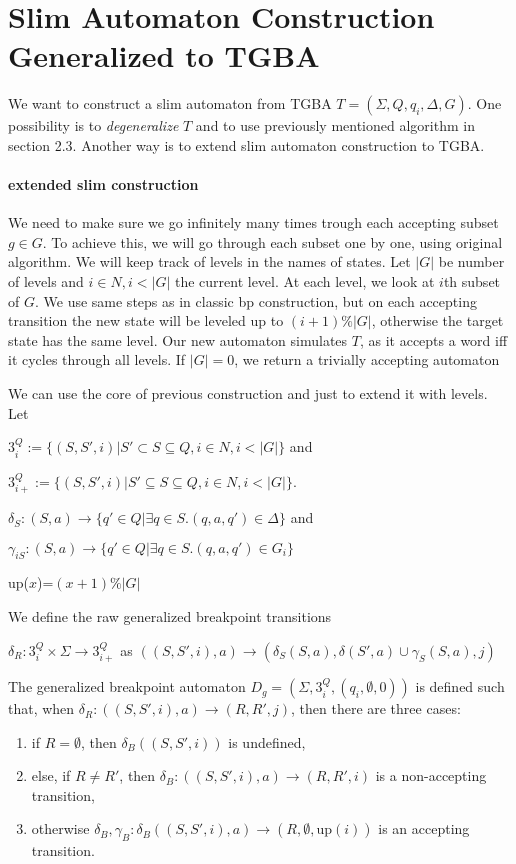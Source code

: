\documentclass[
	digital
nolof, nolot
]{fithesis3}
\begin{document}
			\section{Slim Automaton Construction Generalized to TGBA}
			We want to construct a slim automaton from TGBA $T=(\Sigma, Q, q_i, \Delta, G)$. One possibility is to \emph{degeneralize} $T$ and to use previously mentioned algorithm in section 2.3. Another way is to extend slim automaton construction to TGBA.
			\paragraph{extended slim construction}
			We need to make sure we go infinitely many times trough each accepting subset $g \in G$. To achieve this, we will go through each subset one by one, using original algorithm. We will keep track of levels in the names of states. Let $|G|$ be number of levels and $i \in N, i<|G|$ the current level. At each level, we look at $i$th subset of $G$. We use same steps as in classic bp construction, but on each accepting transition the new state will be leveled up to $(i+1)\%|G|$, otherwise the target state has the same level. Our new automaton simulates $T$, as it accepts a word iff it cycles through all levels. If $|G|=0$, we return a trivially accepting automaton
			
			We can use the core of previous construction and just to extend it with levels. Let
			
			$3^Q_i :=\{(S,S',i)|S'\subset S \subseteq Q, i \in N, i<|G|\}$ and
			
			$3^Q_{i+}:=\{(S,S',i)|S'\subseteq S \subseteq Q, i \in N, i<|G|\}$.
			
			$\delta_S: (S,a)\rightarrow\{q'\in Q | \exists q \in S.(q,a,q') \in \Delta\}$ and
			
			$\gamma_{iS}: (S,a)\rightarrow\{q'\in Q | \exists q \in S.(q,a,q') \in G_i\}$
			
			up($x$)=$(x+1)\%|G|$
			
			We define the raw generalized breakpoint transitions 
			
			$\delta_R:3^Q_i \times \Sigma \rightarrow 3^Q_{i+}$ as
			$((S, S', i), a) \rightarrow(\delta_S(S, a), \delta(S',a)\cup \gamma_S(S, a), j)$
			
			The generalized breakpoint automaton $D_g=(\Sigma, 3^Q_i, ({q_i},\emptyset, 0))$ is defined such that, when $\delta_R:((S, S', i), a) \rightarrow (R, R', j)$, then there are three cases:
			\begin{enumerate}
				\item if $R=\emptyset$, then $\delta_B((S,S',i))$ is undefined,
				\item else, if $R \neq R'$, then $\delta_B:((S,S',i),a) \rightarrow (R,R',i)$ is a non-accepting transition,
				\item otherwise $\delta_B, \gamma_B: \delta_B((S,S',i),a)\rightarrow(R, \emptyset, \text{up}(i))$ is an accepting transition. 
			\end{enumerate}
			
\end{document}
